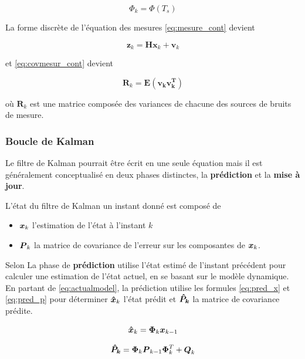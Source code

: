 \documentclass[12pt,a4paper]{report}
\begin{document}
	\begin{equation}
	\Phi_k = \Phi(T_s)
	\end{equation}
	
	\para La forme discrète de l'équation des mesures \ref{eq:mesure_cont} devient
	
	\begin{equation}
	 \boldsymbol z_k = \boldsymbol H \boldsymbol x_k +\boldsymbol  v_k
	\end{equation}
	
	\para et \ref{eq:covmesur_cont} devient
	
	\begin{equation}
	  \boldsymbol R_k = \boldsymbol{E(v_k v_k^T)}
	\end{equation}

	\para où $\boldsymbol R_k$ est une matrice composée des variances de chacune des sources de bruits de mesure.
	
	\subsubsection{Boucle de Kalman}
	\label{sec:boucledekalman}
	
	Le filtre de Kalman pourrait être écrit en une seule équation mais il est généralement conceptualisé en deux phases distinctes, la \textbf{prédiction} et la \textbf{mise à jour}.
	
	\para L'état du filtre de Kalman un instant donné est composé de \begin{itemize}
		\item $\boldsymbol{x}_k$ l'estimation de l'état à l'instant $k$
		\item $\boldsymbol{P}_k$ la matrice de covariance de l'erreur sur les composantes de $\boldsymbol{x}_k$.
	\end{itemize}

	\para Selon \cite{menegatti_generalized_2016} La phase de \textbf{prédiction} utilise l'état estimé de l'instant précédent pour calculer une estimation de l'état actuel, en se basant sur le modèle dynamique. En partant de \ref{eq:actualmodel}, la prédiction utilise les formules \ref{eq:pred_x} et \ref{eq:pred_p} pour déterminer $\boldsymbol{\hat{x}}_k$ l'état prédit et $\boldsymbol{\hat{P}_k}$ la matrice de covariance prédite.
	
	\begin{equation}
		\label{eq:pred_x}
		\boldsymbol{\hat{x}}_k = \boldsymbol{\Phi}_k \boldsymbol{x}_{k-1}
	\end{equation}
	
	\begin{equation}
		\label{eq:pred_p}
		\boldsymbol{\hat{P}_k} = \boldsymbol{\Phi}_k \boldsymbol{P}_{k-1} \boldsymbol{\Phi}_k^T + \boldsymbol{Q}_k
	\end{equation}
	
\end{document}
